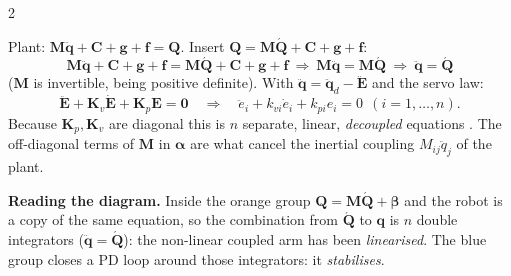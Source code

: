 \begin{multicols}{2}
\begin{fbx}
\end{fbx}
\begin{deriv}
Plant: $\mathbf M\ddot{\mathbf q}+\mathbf C+\mathbf g+\mathbf f=\mathbf Q$. Insert $\mathbf Q=\mathbf M\acute{\mathbf Q}+\mathbf C+\mathbf g+\mathbf f$:
\[\mathbf M\ddot{\mathbf q}+\mathbf C+\mathbf g+\mathbf f=\mathbf M\acute{\mathbf Q}+\mathbf C+\mathbf g+\mathbf f\ \Rightarrow\ \mathbf M\ddot{\mathbf q}=\mathbf M\acute{\mathbf Q}\ \Rightarrow\ \ddot{\mathbf q}=\acute{\mathbf Q}\]
($\mathbf M$ is invertible, being positive definite). With $\ddot{\mathbf q}=\ddot{\mathbf q}_d-\ddot{\mathbf E}$ and the servo law:
\[\boxed{\ddot{\mathbf E}+\mathbf K_v\dot{\mathbf E}+\mathbf K_p\mathbf E=\mathbf 0}\quad\Rightarrow\quad \ddot e_i+k_{vi}\dot e_i+k_{pi}e_i=0\ \ (i=1,\dots,n).\]
Because $\mathbf K_p,\mathbf K_v$ are diagonal this is $n$ separate, linear, \emph{decoupled} equations . The off-diagonal terms of $\mathbf M$ in $\boldsymbol\alpha$ are what cancel the inertial coupling $M_{ij}\ddot q_j$ of the plant.
\end{deriv}
\begin{wnfig}
\begin{center}\small
\wnAqtrue
\def\wnDD{\ddot{\mathbf q}_d}\def\wnD{\dot{\mathbf q}_d}\def\wnR{\mathbf q_d}\def\wnKp{\mathbf K_p}\def\wnKv{\mathbf K_v}\def\wnAl{\mathbf M(\mathbf q)}\def\wnBe{\mathbf C(\mathbf q,\dot{\mathbf q}){+}\mathbf g(\mathbf q){+}\mathbf f(\dot{\mathbf q})}\def\wnPl{\text{Manipulator}}\def\wnU{\mathbf Q}\def\wnP{\mathbf q}\def\wnV{\dot{\mathbf q}}\def\wnE{\mathbf E}\def\wnEd{\dot{\mathbf E}}\def\wnFp{\acute{\mathbf Q}}
\wnloop
\end{center}
\cdlegend
{}
\end{wnfig}
\begin{wnfig}\end{wnfig}
\textbf{Reading the diagram.} Inside the orange group $\mathbf Q=\mathbf M\acute{\mathbf Q}+\boldsymbol\beta$ and the robot is a copy of the same equation, so the combination from $\acute{\mathbf Q}$ to $\mathbf q$ is $n$ double integrators ($\ddot{\mathbf q}=\acute{\mathbf Q}$): the non-linear coupled arm has been \emph{linearised}. The blue group closes a PD loop around those integrators: it \emph{stabilises}.

\end{multicols}
